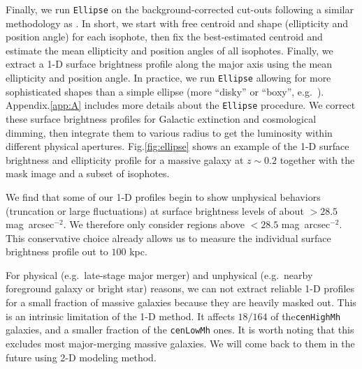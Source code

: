 \documentclass{emulateapj}
\def\sb{mag~arcsec$^{-2}$}
\def\rbcg{\texttt{cenHighMh}}
\def\nbcg{\texttt{cenLowMh}}
\begin{document}
\begin{CJK*}{UTF8}{gbsn}

    
    Finally, we run \texttt{Ellipse} on the background-corrected cut-outs following a 
    similar methodology as \citep{Li2012}. 
    In short, we start with free centroid and shape (ellipticity and position angle) for 
    each isophote, then fix the best-estimated centroid and estimate the mean ellipticity 
    and position angles of all isophotes.  
    Finally, we extract a 1-D surface brightness profile along the major axis using the 
    mean ellipticity and position angle. 
    In practice, we run \texttt{Ellipse} allowing for more sophisticated shapes than a 
    simple ellipse (more ``disky'' or ``boxy'', e.g.\ \citealt{Kormendy2009}). 
    Appendix.\ref{app:A} includes more details about the \texttt{Ellipse} procedure. 
    We correct these surface brightness profiles for Galactic extinction and cosmological 
    dimming, then integrate them to various radius to get the luminosity within different 
    physical apertures. 
    Fig.\ref{fig:ellipse} shows an example of the 1-D surface brightness and ellipticity 
    profile for a massive galaxy at $z\sim0.2$ together with the mask image and a subset 
    of isophotes.  

    We find that some of our 1-D profiles begin to show unphysical behaviors (truncation or 
    large fluctuations) at surface brightness levels of about $>28.5$ \sb. 
    We therefore only consider regions above $<28.5$ \sb. 
    This conservative choice already allows us to measure the individual surface 
    brightness profile out to $100$ kpc. 
    
    For physical (e.g.\ late-stage major merger) and unphysical (e.g.\ nearby foreground 
    galaxy or bright star) reasons, we can not extract reliable 1-D profiles for a small 
    fraction of massive galaxies because they are heavily masked out. 
    This is an intrinsic limitation of the 1-D method. 
    It affects $18/164$ of the\rbcg{} galaxies, and a smaller fraction of the \nbcg{} 
    ones. 
    It is worth noting that this excludes most major-merging massive galaxies. 
    We will come back to them in the future using 2-D modeling method.


\end{CJK*}
\end{document}
